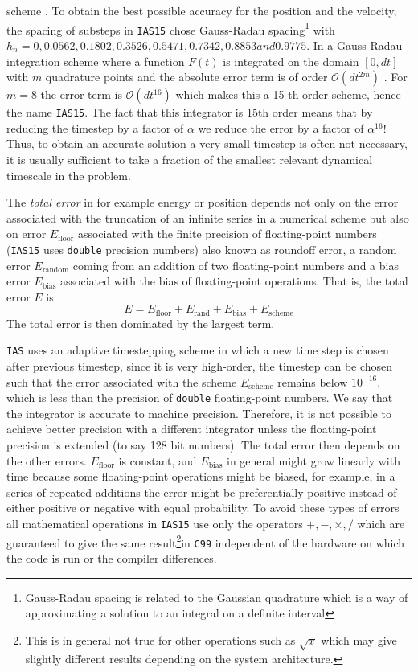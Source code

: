 \documentclass[twoside,openright,titlepage,numbers=noenddot,headinclude,%
                footinclude=true,cleardoublepage=empty,abstractoff, 
                BCOR=5mm,paper=a4,fontsize=11pt,%
                american,%
                ]{scrreprt}%
\begin{document}
scheme
\citep[see][for details]{Rein2014}. To obtain the best possible accuracy for
the position and the velocity, the spacing of substeps in \texttt{IAS15} 
\citet{Rein2014} chose Gauss-Radau spacing\footnote{Gauss-Radau spacing is related to 
the Gaussian quadrature which is a way of approximating a solution to an 
integral on a definite interval} with $h_n=0, 0.0562, 0.1802, 0.3526, 
0.5471, 0.7342, 0.8853 and 0.9775$. In a Gauss-Radau integration scheme
where a function $F(t)$ is integrated on the domain $[0,dt]$ with $m$ quadrature
points and the absolute error term is of order $\mathcal{O}(dt^{2m})$
\citet{Rein2014}. 
For $m=8$ the error term is $\mathcal{O}(dt^{16})$ which makes this
a 15-th order scheme, hence the name \texttt{IAS15}. The fact that this
integrator is 15th order means that by reducing the timestep by a factor of
$\alpha$ we reduce the error by a factor of $\alpha^{16}$! Thus, to obtain
an accurate solution a very small timestep is often not necessary, it is
usually sufficient to take a fraction of the smallest relevant dynamical
timescale in the problem.

The \emph{total error} in for example energy or position 
depends not only on the error associated
with the truncation of an infinite series in a numerical scheme but also
on error $E_\text{floor}$ associated with the finite precision of 
floating-point numbers 
(\texttt{IAS15} uses \texttt{double} precision numbers) also known as
roundoff error, a random error 
$E_\text{random}$ coming from an addition of two floating-point numbers 
and a bias error $E_\text{bias}$ associated
with the bias of floating-point operations. That is, the total error $E$ is
\begin{equation}
    E=E_\text{floor}+E_\text{rand}+E_\text{bias}+E_\text{scheme}
\end{equation}
The total error is then dominated by the largest term. 

\texttt{IAS} uses an adaptive timestepping scheme in which a new time
step is chosen after previous timestep, since it is very high-order, the 
timestep can be chosen such that the error associated with the scheme
$E_\text{scheme}$ remains below $10^{-16}$, which is less than the precision
of \texttt{double} floating-point numbers. We say that the integrator is
accurate to machine precision. Therefore, it is not possible to achieve
better precision with a different integrator unless the floating-point 
precision is extended (to say 128 bit numbers). 
The total error then depends on the other errors. $E_\text{floor}$ is constant,
and $E_\text{bias}$ in general might grow linearly with time because
some floating-point operations might be biased, for example, in a series
of repeated additions the error might be preferentially positive instead of
either positive or negative with equal probability. To avoid these types of
errors all mathematical operations in \texttt{IAS15} use only the operators
$+,-,\times,/$ which are guaranteed to give the same result\footnote{This is 
in general not true for other operations such as $\sqrt{x}$ which may give 
slightly different results depending on the system architecture.}in \texttt{C99}
independent of the hardware on which the code is run or the compiler differences.
\end{document}
